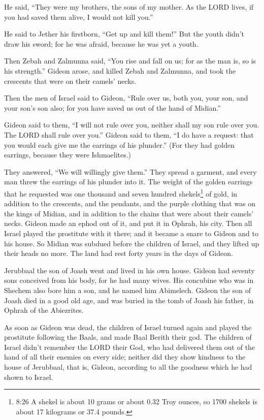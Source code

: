  He said, ``They were my brothers, the sons of my mother.
As the LORD lives, if you had saved them alive, I would not kill you.''

 He said to Jether his firstborn, ``Get up and kill them!''
But the youth didn't draw his sword; for he was afraid, because he was
yet a youth.

 Then Zebah and Zalmunna said, ``You rise and fall on us;
for as the man is, so is his strength.'' Gideon arose, and killed Zebah
and Zalmunna, and took the crescents that were on their camels' necks.

 Then the men of Israel said to Gideon, ``Rule over us,
both you, your son, and your son's son also; for you have saved us out
of the hand of Midian.''

 Gideon said to them, ``I will not rule over you, neither
shall my son rule over you. The LORD shall rule over you.''
 Gideon said to them, ``I do have a request: that you would
each give me the earrings of his plunder.'' (For they had golden
earrings, because they were Ishmaelites.)

 They answered, ``We will willingly give them.'' They
spread a garment, and every man threw the earrings of his plunder into
it.  The weight of the golden earrings that he requested
was one thousand and seven hundred shekels\footnote{8:26 A shekel is
  about 10 grams or about 0.32 Troy ounces, so 1700 shekels is about 17
  kilograms or 37.4 pounds.} of gold, in addition to the crescents, and
the pendants, and the purple clothing that was on the kings of Midian,
and in addition to the chains that were about their camels' necks.
 Gideon made an ephod out of it, and put it in Ophrah, his
city. Then all Israel played the prostitute with it there; and it became
a snare to Gideon and to his house.  So Midian was subdued
before the children of Israel, and they lifted up their heads no more.
The land had rest forty years in the days of Gideon.

 Jerubbaal the son of Joash went and lived in his own
house.  Gideon had seventy sons conceived from his body,
for he had many wives.  His concubine who was in Shechem
also bore him a son, and he named him Abimelech.  Gideon
the son of Joash died in a good old age, and was buried in the tomb of
Joash his father, in Ophrah of the Abiezrites.

 As soon as Gideon was dead, the children of Israel turned
again and played the prostitute following the Baals, and made Baal
Berith their god.  The children of Israel didn't remember
the LORD their God, who had delivered them out of the hand of all their
enemies on every side;  neither did they show kindness to
the house of Jerubbaal, that is, Gideon, according to all the goodness
which he had shown to Israel.


